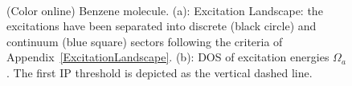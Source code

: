 \documentclass[reprint,aps,prb]{revtex4-1}
\begin{document}
\begin{figure}[ht]
\centering
{} \\
\centering
{}
\caption{(Color online) Benzene molecule. (a): Excitation Landscape: the excitations have been separated into discrete (black circle) and continuum (blue square) sectors following the criteria of Appendix~\ref{ExcitationLandscape}. (b): DOS of excitation energies $\Omega_a$. The first IP threshold is depicted as the vertical dashed line.}
\end{figure}
\end{document}
